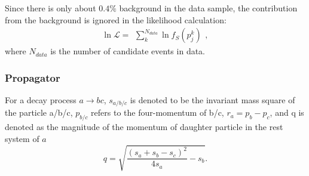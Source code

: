 {    Since there is only about $0.4\%$ background in the data sample, the contribution from the background is ignored in the likelihood calculation:
    \begin{equation}
    \ln{\mathcal{L}} = \begin{matrix}\sum_{k}^{N_{data}} \ln f_{S}(p_{j}^{k})\end{matrix},  \label{likelihood}
    \end{equation}
    where $N_{data}$ is the number of candidate events in data.


    \subsubsection{Propagator}
    \label{propagator}
    \par{
        For a decay process $a \rightarrow bc$, $s_{a/b/c}$ is denoted to be the invariant mass square of the particle a/b/c, $p_{b/c}$ refers to the four-momentum of b/c, $r_{a}=p_{b}-p_{c}$, and q is denoted as the magnitude of the momentum of daughter particle in the rest system of $a$
        \begin{equation}
            q=\sqrt{ \frac{(s_{a} + s_{b} - s_{c})^{2}}{4s_{a}} - s_{b}}. \label{base-q}
        \end{equation}

}}
